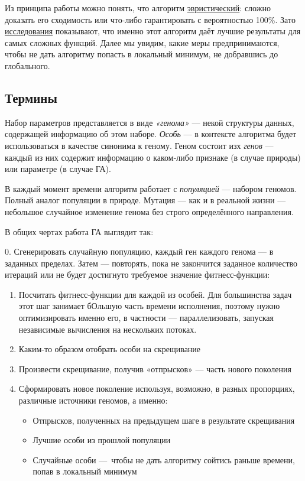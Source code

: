 \documentclass[11pt]{article}
\begin{document}
    Из принципа работы можно понять, что алгоритм \href{https://en.wikipedia.org/wiki/Heuristic_(computer_science)}{эвристический}: сложно доказать его сходимость или что-либо гарантировать с вероятностью 100\%.
    Зато \href{talgat.org/news/wp-content/uploads/2018/08/112.pdf}{исследования} показывают, что именно этот алгоритм даёт лучшие результаты для самых сложных функций.
    Далее мы увидим, какие меры предпринимаются, чтобы не дать алгоритму попасть в локальный минимум, не добравшись до глобального.

    \subsection{Термины}
    Набор параметров представляется в виде \textit{«генома»} — некой структуры данных, содержащей информацию об этом наборе.
    \textit{Особь} — в контексте алгоритма будет использоваться в качестве синонима к геному.
    Геном состоит изх \textit{генов} — каждый из них содержит информацию о каком-либо признаке (в случае природы) или параметре (в случае ГА).

    В каждый момент времени алгоритм работает с \textit{популяцией} — набором геномов. Полный аналог популяции в природе.
    Мутация — как и в реальной жизни — небольшое случайное изменение генома без строго определённого направления.

    В общих чертах работа ГА выглядит так:

    0. Сгенерировать случайную популяцию, каждый ген каждого генома — в заданных пределах.
    Затем — повторять, пока не закончится заданное количество итераций или не будет достигнуто требуемое значение фитнесс-функции:
    \begin{enumerate}
        \item Посчитать фитнесс-функции для каждой из особей.
        Для большинства задач этот шаг занимает бОльшую часть времени исполнения, поэтому нужно оптимизировать именно его, в частности — параллелизовать, запуская независимые вычисления на нескольких потоках.
        \item Каким-то образом отобрать особи на скрещивание
        \item Произвести скрещивание, получив «отпрысков» — часть нового поколения
        \item Сформировать новое поколение используя, возможно, в разных пропорциях, различные источники геномов, а именно:
                \begin{itemize}
                    \item Отпрысков, полученных на предыдущем шаге в результате скрещивания
                    \item Лучшие особи из прошлой популяции
                    \item Случайные особи — чтобы не дать алгоритму сойтись раньше времени, попав в локальный минимум
                \end{itemize}
    \end{enumerate}
\end{document}
